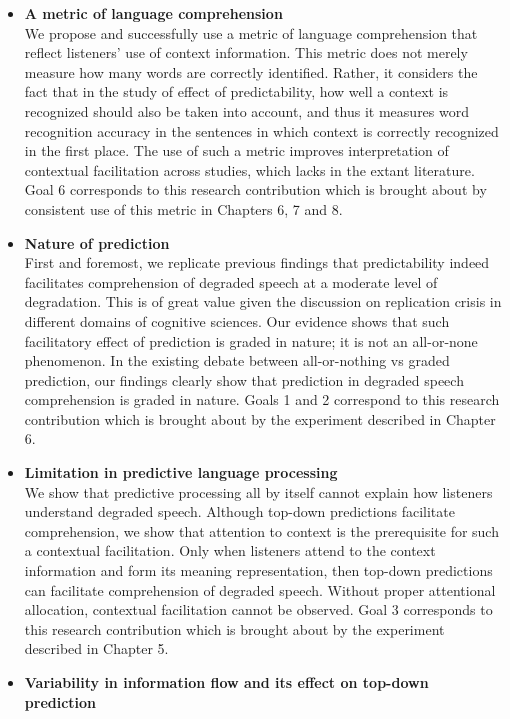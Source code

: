 \documentclass[a4paper, nobind]{templates/ociamthesis}
\begin{document}
\begin{itemize}
\item
  \textbf{A metric of language comprehension}\\
  We propose and successfully use a metric of language comprehension that reflect listeners' use of context information.
  This metric does not merely measure how many words are correctly identified.
  Rather, it considers the fact that in the study of effect of predictability, how well a context is recognized should also be taken into account,
  and thus it measures word recognition accuracy in the sentences in which context is correctly recognized in the first place.
  The use of such a metric improves interpretation of contextual facilitation across studies, which lacks in the extant literature.
  Goal 6 corresponds to this research contribution which is brought about by consistent use of this metric in Chapters 6, 7 and 8.
\item
  \textbf{Nature of prediction}\\
  First and foremost, we replicate previous findings that predictability indeed facilitates comprehension of degraded speech at a moderate level of degradation.
  This is of great value given the discussion on replication crisis in different domains of cognitive sciences.
  Our evidence shows that such facilitatory effect of prediction is graded in nature; it is not an all-or-none phenomenon.
  In the existing debate between all-or-nothing vs graded prediction, our findings clearly show that prediction in degraded speech comprehension is graded in nature.
  Goals 1 and 2 correspond to this research contribution which is brought about by the experiment described in Chapter 6.
\item
  \textbf{Limitation in predictive language processing}\\
  We show that predictive processing all by itself cannot explain how listeners understand degraded speech.
  Although top-down predictions facilitate comprehension, we show that attention to context is the prerequisite for such a contextual facilitation.
  Only when listeners attend to the context information and form its meaning representation, then top-down predictions can facilitate comprehension of degraded speech.
  Without proper attentional allocation, contextual facilitation cannot be observed.
  Goal 3 corresponds to this research contribution which is brought about by the experiment described in Chapter 5.
\item
  \textbf{Variability in information flow and its effect on top-down prediction}\\

\end{itemize}
\end{document}
